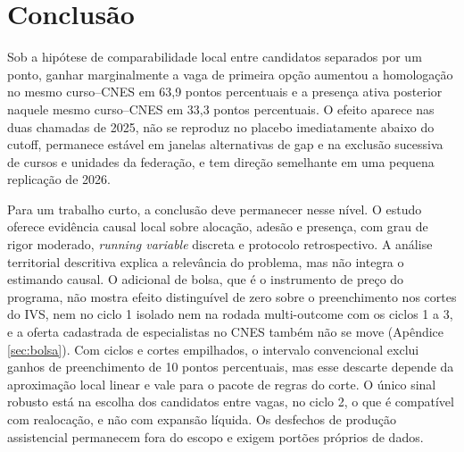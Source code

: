 \documentclass[11pt,a4paper]{article}
\begin{document}
\section{Conclusão}
\label{sec:conclusao}

Sob a hipótese de comparabilidade local entre candidatos separados por um ponto,
ganhar marginalmente a vaga de primeira opção aumentou a homologação no mesmo
curso--CNES em 63,9 pontos percentuais e a presença ativa posterior naquele
mesmo curso--CNES em 33,3 pontos percentuais. O efeito aparece nas duas chamadas
de 2025, não se reproduz no placebo imediatamente abaixo do cutoff, permanece
estável em janelas alternativas de gap e na exclusão sucessiva de cursos e
unidades da federação, e tem direção semelhante em uma pequena replicação de
2026.

Para um trabalho curto, a conclusão deve permanecer nesse nível. O estudo oferece
evidência causal local sobre alocação, adesão e presença, com grau de rigor
moderado, \emph{running variable} discreta e protocolo retrospectivo. A análise
territorial descritiva explica a relevância do problema, mas não integra o
estimando causal. O adicional de bolsa, que é o instrumento de preço do
programa, não mostra efeito distinguível de zero sobre o preenchimento nos
cortes do IVS, nem no ciclo 1 isolado nem na rodada multi-outcome com os
ciclos 1 a 3, e a oferta cadastrada de especialistas no CNES também não se
move (Apêndice \ref{sec:bolsa}). Com ciclos e cortes empilhados, o intervalo
convencional exclui ganhos de preenchimento de 10 pontos percentuais, mas esse
descarte depende da aproximação local linear e vale para o pacote de regras do
corte. O único sinal robusto está na escolha dos candidatos entre vagas, no
ciclo 2, o que é compatível com realocação, e não com expansão líquida. Os
desfechos de produção assistencial permanecem fora do escopo e exigem portões
próprios de dados.
\end{document}
